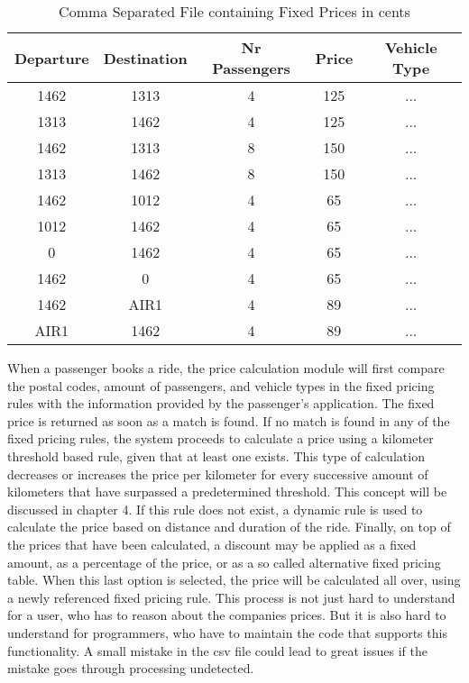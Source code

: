 \begin{table}[htbp!]
	\centering
	\begin{tabular}{c|c|c|c|c}
		\toprule
		Departure & Destination & Nr Passengers & Price & Vehicle Type \\
		\midrule
		1462      & 1313        & 4             & 125   & ...          \\
		1313      & 1462        & 4             & 125   & ...          \\
		1462      & 1313        & 8             & 150   & ...          \\
		1313      & 1462        & 8             & 150   & ...          \\
		1462      & 1012        & 4             & 65    & ...          \\
		1012      & 1462        & 4             & 65    & ...          \\
		0         & 1462        & 4             & 65    & ...          \\
		1462      & 0           & 4             & 65    & ...          \\
		1462      & AIR1        & 4             & 89    & ...          \\
		AIR1      & 1462        & 4             & 89    & ...          \\
		\bottomrule
	\end{tabular}
	\caption[Fixed Prices]{Comma Separated File containing Fixed Prices in cents}
	\label{tab:fixedprices}
\end{table}

When a passenger books a ride, the price calculation module will first compare the postal codes, amount of passengers, and vehicle types in the fixed pricing rules with the information provided by the passenger's application. The fixed price is returned as soon as a match is found. If no match is found in any of the fixed pricing rules, the system proceeds to calculate a price using a kilometer threshold based rule, given that at least one exists. This type of calculation decreases or increases the price per kilometer for every successive amount of kilometers that have surpassed a predetermined threshold. This concept will be discussed in chapter 4. If this rule does not exist, a dynamic rule is used to calculate the price based on distance and duration of the ride. Finally, on top of the prices that have been calculated, a discount may be applied as a fixed amount, as a percentage of the price, or as a so called alternative fixed pricing table. When this last option is selected, the price will be calculated all over, using a newly referenced fixed pricing rule. This process is not just hard to understand for a user, who has to reason about the companies prices. But it is also hard to understand for programmers, who have to maintain the code that supports this functionality. A small mistake in the csv file could lead to great issues if the mistake goes through processing undetected.

